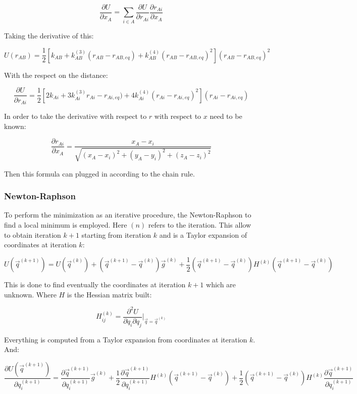 	$$\frac{\partial U}{\partial x_A} = \sum\limits_{i\in A}\frac{\partial U}{\partial r_{Ai}}\frac{\partial r_{Ai}}{\partial x_A}$$

	Taking the derivative of this:

	$$U(r_{AB}) = \frac{1}{2}[k_{AB}+k_{AB}^{(3)}(r_{AB}-r_{AB, eq}) + k_{AB}^{(4)}(r_{AB}-r_{AB, eq})^2](r_{AB}-r_{AB,eq})^2$$

	With the respect on the distance:

	$$\frac{\partial U}{\partial r_{Ai}} = \frac{1}{2}[2k_{Ai}+3k_{Ai}^{(3)}r_{Ai}-r_{Ai, eq}) + 4k^{(4)}_{Ai}(r_{Ai}-r_{Ai, eq})^2](r_{Ai}-r_{Ai, eq})$$

	In order to take the derivative with respect to $r$ with respect to $x$ need to be known:

	$$\frac{\partial r_{Ai}}{\partial x_A} = \frac{x_A-x_i}{\sqrt{(x_A-x_i)^2+(y_A-y_i)^2+(z_A-z_i)^2}}$$

	Then this formula can plugged in according to the chain rule.

		\subsubsection{Newton-Raphson}
		To perform the minimization as an iterative procedure, the Newton-Raphson to find a local minimum is employed.
		Here $(n)$ refers to the iteration.
		This allow to obtain iteration $k+1$ starting from iteration $k$ and is a Taylor expansion of coordinates at iteration $k$:

		$$U(\vec{q}^{(k+1)}) = U(\vec{q}^{(k)}) + (\vec{q}^{(k+1)} -\vec{q}^{(k)})\vec{g}^{(k)} + \frac{1}{2}(\vec{q}^{(k+1)}-\vec{q}^{(k)})H^{(k)}(\vec{q}^{(k+1)}-\vec{q}^{(k)})$$

		This is done to find eventually the coordinates at iteration $k+1$ which are unknown.
		Where $H$ is the Hessian matrix built:

		$$H_{ij}^{(k)} = \frac{\partial^2 U}{\partial q_i\partial q_j}|_{\vec{q}=\vec{q}^{(k)}}$$

		Everything is computed from a Taylor expansion from coordinates at iteration $k$.
		And:

		$$\frac{\partial U(\vec{q}^{(k+1)})}{\partial q_i^{(k+1)}} = \frac{\partial \vec{q}^{(k+1)}}{\partial q_i^{(k+1)}}\vec{g}^{(k)}+ \frac{1}{2}\frac{\partial \vec{q}^{(k+1)}}{\partial q_i^{(k+1)}}H^{(k)}(\vec{q}^{(k+1)}-\vec{q}^{(k)})+\frac{1}{2}(\vec{q}^{(k+1)}-\vec{q}^{(k)})H^{(k)}\frac{\partial \vec{q}^{(k+1)}}{\partial q_i^{(k+1)}}$$

